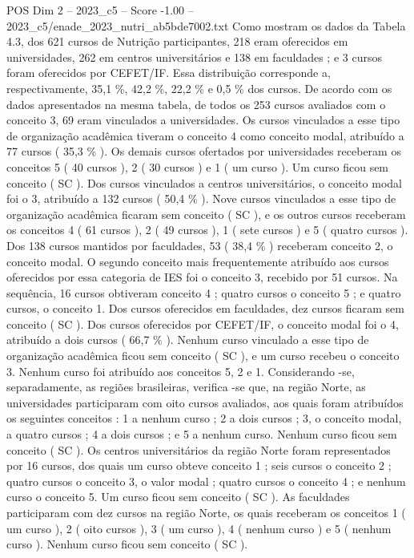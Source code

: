 \begin{textsample}{POS Dim 2 – 2023\_c5 – Score -1.00 – 2023\_c5/enade\_2023\_nutri\_ab5bde7002.txt}
Como mostram os dados da Tabela 4.3, dos 621 cursos de Nutrição participantes, 218 eram oferecidos em universidades, 262 em centros universitários e 138 em faculdades ; e 3 cursos foram oferecidos por CEFET/IF.
Essa distribuição corresponde a, respectivamente, 35,1 \%, 42,2 \%, 22,2 \% e 0,5 \% dos cursos.
De acordo com os dados apresentados na mesma tabela, de todos os 253 cursos avaliados com o conceito 3, 69 eram vinculados a universidades.
Os cursos vinculados a esse tipo de organização acadêmica tiveram o conceito 4 como conceito modal, atribuído a 77 cursos ( 35,3 \% ).
Os demais cursos ofertados por universidades receberam os conceitos 5 ( 40 cursos ), 2 ( 30 cursos ) e 1 ( um curso ).
Um curso ficou sem conceito ( SC ).
Dos cursos vinculados a centros universitários, o conceito modal foi o 3, atribuído a 132 cursos ( 50,4 \% ).
Nove cursos vinculados a esse tipo de organização acadêmica ficaram sem conceito ( SC ), e os outros cursos receberam os conceitos 4 ( 61 cursos ), 2 ( 49 cursos ), 1 ( sete cursos ) e 5 ( quatro cursos ).
Dos 138 cursos mantidos por faculdades, 53 ( 38,4 \% ) receberam conceito 2, o conceito modal.
O segundo conceito mais frequentemente atribuído aos cursos oferecidos por essa categoria de IES foi o conceito 3, recebido por 51 cursos.
Na sequência, 16 cursos obtiveram conceito 4 ; quatro cursos o conceito 5 ; e quatro cursos, o conceito 1.
Dos cursos oferecidos em faculdades, dez cursos ficaram sem conceito ( SC ).
Dos cursos oferecidos por CEFET/IF, o conceito modal foi o 4, atribuído a dois cursos ( 66,7 \% ).
Nenhum curso vinculado a esse tipo de organização acadêmica ficou sem conceito ( SC ), e um curso recebeu o conceito 3.
Nenhum curso foi atribuído aos conceitos 5, 2 e 1.
Considerando -se, separadamente, as regiões brasileiras, verifica -se que, na região Norte, as universidades participaram com oito cursos avaliados, aos quais foram atribuídos os seguintes conceitos : 1 a nenhum curso ; 2 a dois cursos ; 3, o conceito modal, a quatro cursos ; 4 a dois cursos ; e 5 a nenhum curso.
Nenhum curso ficou sem conceito ( SC ).
Os centros universitários da região Norte foram representados por 16 cursos, dos quais um curso obteve conceito 1 ; seis cursos o conceito 2 ; quatro cursos o conceito 3, o valor modal ; quatro cursos o conceito 4 ; e nenhum curso o conceito 5.
Um curso ficou sem conceito ( SC ).
As faculdades participaram com dez cursos na região Norte, os quais receberam os conceitos 1 ( um curso ), 2 ( oito cursos ), 3 ( um curso ), 4 ( nenhum curso ) e 5 ( nenhum curso ).
Nenhum curso ficou sem conceito ( SC ).

\end{textsample}
